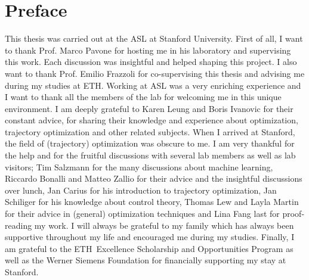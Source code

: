 \chapter*{Preface}
This thesis was carried out at the \ac{ASL} at Stanford University. First of all, I want to thank Prof. Marco Pavone for hosting me in his laboratory and supervising this work. Each discussion was insightful and helped shaping this project. I also want to thank Prof. Emilio Frazzoli for co-supervising this thesis and advising me during my studies at \ac{ETH}.
\newline
Working at \ac{ASL} was a very enriching experience and I want to thank all the members of the lab for welcoming me in this unique environment. I am deeply grateful to Karen Leung and Boris Ivanovic for their constant advice, for sharing their knowledge and experience about optimization, trajectory optimization and other related subjects.
\newline
When I arrived at Stanford, the field of (trajectory) optimization was obscure to me. I am very thankful for the help and for the fruitful discussions with several lab members as well as lab visitors; Tim Salzmann for the many discussions about machine learning, Riccardo Bonalli and Matteo Zallio for their advice and the insightful discussions over lunch, Jan Carius for his introduction to trajectory optimization, Jan Schiliger for his knowledge about control theory,  Thomas Lew and Layla Martin for their advice in (general) optimization techniques and Lina Fang last for proof-reading my work. I will always be grateful to my family which has always been supportive throughout my life and encouraged me during my studies. Finally, I am grateful to the \ac{ETH} Excellence Scholarship and Opportunities Program as well as the Werner Siemens Foundation for financially supporting my stay at Stanford.

\cleardoublepage